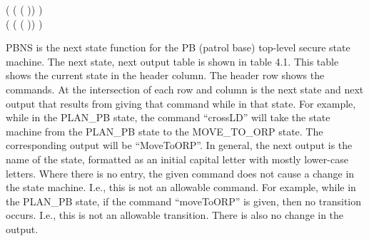 \begin{itemize}
\begin{itemize}
   (  ( ( )) \HOLSymConst{=} ) \HOLSymConst{\HOLTokenConj{}}\ \\ (  ( ( )) \HOLSymConst{=} )
 \end{itemize}
 PBNS is the next state function for the PB (patrol base) top-level secure state machine.
 The next state, next output table is shown in table 4.1. This table shows the current state in the header column. The
 header row shows the commands. At the intersection of each row and column is the next
 state and next output that results from giving that command while in that state. For
 example, while in the PLAN_PB state, the command “crossLD” will take the state machine
 from the PLAN_PB state to the MOVE_TO_ORP state. The corresponding output will be
 “MoveToORP”. In general, the next output is the name of the state, formatted as an
 initial capital letter with mostly lower-case letters. Where there is no entry, the
 given command does not cause a change in the state machine. I.e., this is not an
 allowable command. For example, while in the PLAN_PB state, if the command “moveToORP”
 is given, then no transition occurs. I.e., this is not an allowable transition.
 There is also no change in the output.\\\\
 

\end{itemize}
